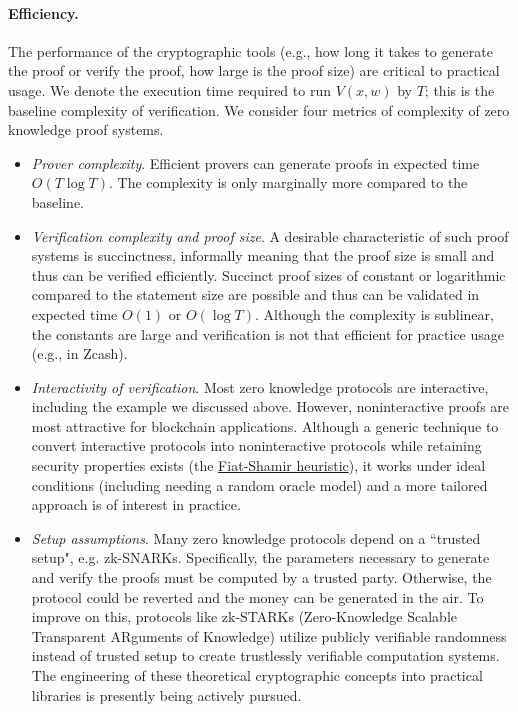 \documentclass[a4paper]{article}
\newcommand{\pramod}[1]{{\color{red}
\footnotesize[Pramod: #1] }}
\begin{document}
\paragraph{Efficiency.}  
The performance of the cryptographic tools (e.g., how long it takes to generate the proof or verify the proof, how large is the proof size) are critical to practical usage.  
We denote the execution time required to run $V(x,w)$ by $T$; this is the baseline complexity of verification. We consider four metrics of complexity of zero knowledge proof systems. 
\begin{itemize}
    \item  {\em Prover complexity}. Efficient provers can generate proofs in expected time $O(T \log T)$. The complexity is only marginally more compared to the baseline. 
    \item  {\em Verification complexity and proof size}. A desirable characteristic of such proof systems is succinctness, informally meaning that the proof size is small and thus can be verified efficiently. Succinct proof sizes of  constant or logarithmic compared to the statement size are possible and  thus can be validated in expected time $O(1)$ or $O(\log T)$. Although the complexity is sublinear, the constants are large and verification is not that efficient for practice usage (e.g., in Zcash). 
    \item {\em Interactivity of verification}. Most zero knowledge protocols are interactive, including the example we discussed above. However, noninteractive proofs are most attractive for blockchain applications. Although a generic  technique  to convert interactive protocols into noninteractive protocols while retaining security properties exists (the \href{https://en.wikipedia.org/wiki/Fiat–Shamir_heuristic}{Fiat-Shamir heuristic}), it works under ideal conditions (including needing a random oracle model) and a more tailored approach is  of interest in practice. %
    \item {\em Setup assumptions}. Many zero knowledge protocols depend on a ``trusted setup", e.g. zk-SNARKs. Specifically, the parameters necessary to generate and verify the proofs must be computed by a trusted party. Otherwise, the protocol could be reverted and the money can be generated in the air. To improve on this, protocols like zk-STARKs (Zero-Knowledge Scalable Transparent ARguments of Knowledge) utilize publicly verifiable randomness instead of trusted setup to create trustlessly verifiable computation systems. The engineering of these theoretical cryptographic concepts into practical libraries is presently being actively pursued. 
\end{itemize} 
\end{document}
